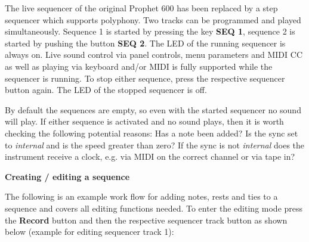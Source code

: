 The live sequencer of the original Prophet 600 has been replaced by a step sequencer which supports polyphony. Two tracks can be programmed and played simultaneously. Sequence 1 is started by pressing the key \textbf{SEQ 1}, sequence 2 is started by pushing the button \textbf{SEQ 2}. The LED of the running sequencer is always on. Live sound control via panel controls, menu parameters and MIDI CC as well as playing via keyboard and/or MIDI is fully supported while the sequencer is running. To stop either sequence, press the respective sequencer button again. The LED of the stopped sequencer is off. 

By default the sequences are empty, so even with the started sequencer no sound will play. If either sequence is activated and no sound plays, then it is worth checking the following potential reasons: Has a note been added? Is the sync set to \textit{internal} and is the speed greater than zero? If the sync is not \textit{internal} does the instrument receive a clock, e.g. via MIDI on the correct channel or via tape in?

\textbf{Creating / editing a sequence}

The following is an example work flow for adding notes, rests and ties to a sequence and covers all editing functions needed. To enter the editing mode press the \textbf{Record} button and then the respective sequencer track button as shown below (example for editing sequencer track 1):


